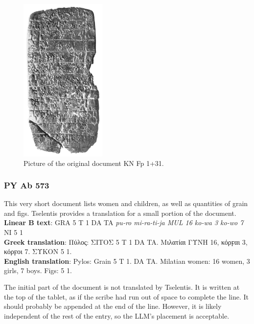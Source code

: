 \begin{figure}[H]
  \centering
  \includegraphics[width=0.38\textwidth]{Images/4088.png} %
  \caption{Picture of the original document KN Fp 1+31.}
  \label{fig:doc10}
\end{figure}

\subsubsection{PY Ab 573}
This very short document lists women and children, as well as quantities of grain and figs.
Tselentis provides a translation for a small portion of the document. \\
\textbf{Linear B text}: GRA 5 T 1 DA TA \textit{pu-ro mi-ra-ti-ja MUL 16 ko-wa 3 ko-wo 7} NI 5 1 \\
\textbf{Greek translation}: \textgreek{Πύλος: ΣΙΤΟΣ 5 T 1 DA TA. Μιλατίαι ΓΥΝΗ 16, κόρϝαι 3, κόρϝοι 7. ΣΥΚΟΝ 5 1.} \\
\textbf{English translation}: Pylos: Grain 5 T 1. DA TA. Milatian women: 16 women, 3 girls, 7 boys. Figs: 5 1.

The initial part of the document is not translated by Tselentis. It is written at the top of the tablet, as if the scribe had run out of space to complete the line.
It should probably be appended at the end of the line.
However, it is likely independent of the rest of the entry, so the LLM's placement is acceptable.

